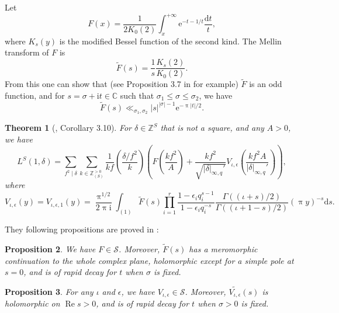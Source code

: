 \documentclass[10pt,oneside,reqno]{amsart}
\newcommand\rmd{\mathrm{d}}
\newcommand\rme{\mathrm{e}}
\newcommand\rmi{\mathrm{i}}
\newcommand\cS{\mathcal{S}}
\newcommand\CC{\mathbb{C}}
\newcommand\ZZ{\mathbb{Z}}
\renewcommand\Re{\mathop{\mathrm{Re}}}
\renewcommand\leq{\leqslant}
\newcommand\legendresymbol[2]{\genfrac{(}{)}{}{}{#1}{#2}}
\theoremstyle{THEOREM}
\newtheorem{theorem}{Theorem}[section]
\newtheorem{proposition}[theorem]{Proposition}
\theoremstyle{DEFINITION}
\theoremstyle{EXERCISE}
\numberwithin{equation}{section}
\begin{document}
Let
\[
F(x)=\frac{1}{2K_0(2)}\int_{x}^{+\infty}\rme^{-t-1/t}\frac{\rmd t}{t},
\]
where $K_s(y)$ is the modified Bessel function of the second kind. The Mellin transform of $F$ is
\begin{equation}\label{eq:mellinf}
\widetilde{F}(s)=\frac{1}{s}\frac{K_s(2)}{K_0(2)}.
\end{equation}
From this one can show that (see Proposition 3.7 in \cite{cheng2025} for example) $\widetilde{F}$ is an odd function, and for $s=\sigma+\rmi t\in \CC$ such that $\sigma_1\leq \sigma\leq \sigma_2$, we have
\begin{equation}\label{eq:frapiddecay}
\widetilde{F}(s)\ll_{\sigma_1,\sigma_2} |s|^{|\sigma|-1}\rme^{-\uppi|t|/2}.
\end{equation}

\begin{theorem}[\cite{cheng2025}, Corollary 3.10]
For $\delta\in \ZZ^S$ that is not a square, and any $A>0$, we have
\begin{equation}\label{eq:approximatefeat1}
L^{S}(1,\delta)=\sum_{f^2\mid \delta}\sum_{k\in \ZZ_{(S)}^{>0}}\frac{1}{kf}\legendresymbol{\delta/f^2}{k}\left(F\legendresymbol{kf^2}{A}+\frac{kf^2}{\sqrt{|\delta|_{\infty,q}'}}V_{\iota,\epsilon}\legendresymbol{kf^2A}{|\delta|_{\infty,q}'}\right),
\end{equation}
where 
\begin{equation}\label{eq:defv}
V_{\iota,\epsilon}(y)=V_{\iota,\epsilon,1}(y)=\frac{\uppi^{1/2}}{2\uppi \rmi}\int_{(1)}\widetilde{F}(s)\prod_{i=1}^{r}\frac{1-\epsilon_i q_i^{s-1}}{1-\epsilon_i q_i^{-s}}\frac{\Gamma((\iota+s)/2)}{\Gamma((\iota+1-s)/2)}(\uppi y)^{-s}\rmd s.
\end{equation}
\end{theorem}

They following propositions are proved in \cite{cheng2025b}:
\begin{proposition}\label{prop:propertyf}
We have $F\in \cS$. Moreover, $\widetilde{F}(s)$ has a meromorphic continuation to the whole complex plane, holomorphic except for a simple pole at $s=0$, and is of rapid decay for $t$ when $\sigma$ is fixed.
\end{proposition}

\begin{proposition}\label{prop:propertyh}
For any $\iota$ and $\epsilon$, we have $V_{\iota,\epsilon}\in \cS$. Moreover, $\widetilde{V_{\iota,\epsilon}}(s)$ is holomorphic on $\Re s>0$, and is of rapid decay for $t$ when $\sigma>0$ is fixed.
\end{proposition}
\end{document}
